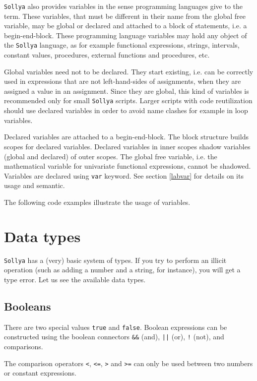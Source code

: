 \documentclass[a4paper]{article}
\newcommand{\key}[1]{\texttt{#1}}
\newcommand{\sollya}{\texttt{Sollya}\xspace}
\begin{document}
\sollya also provides variables in the sense programming languages
give to the term.  These variables, that must be different in their
name from the global free variable, may be global or declared and
attached to a block of statements, i.e. a begin-end-block. These
programming language variables may hold any object of the \sollya
language, as for example functional expressions, strings, intervals,
constant values, procedures, external functions and procedures, etc.

Global variables need not to be declared. They start existing,
i.e. can be correctly used in expressions that are not left-hand-sides
of assignments, when they are assigned a value in an assignment. Since
they are global, this kind of variables is recommended only for small
\sollya scripts.  Larger scripts with code reutilization should use
declared variables in order to avoid name clashes for example in loop
variables.

Declared variables are attached to a begin-end-block. The block
structure builds scopes for declared variables. Declared variables in
inner scopes shadow variables (global and declared) of outer
scopes. The global free variable, i.e. the mathematical variable for
univariate functional expressions, cannot be shadowed. Variables are
declared using \key{var} keyword. See section \ref{labvar} for details
on its usage and semantic.

The following code examples illustrate the usage of variables.




\section{Data types}
\sollya has a (very) basic system of types. If you try to perform an illicit operation (such as adding a number and a string, for instance), you will get a type error. Let us see the available data types.

\subsection{Booleans}
There are two special values \key{true} and \key{false}. Boolean expressions can be constructed using the boolean connectors \key{\&\&} (and), \key{||} (or), \key{!} (not), and comparisons.

The comparison operators \key{<}, \key{<=}, \key{>} and \key{>=} can only be used between two numbers or constant expressions.
\end{document}
